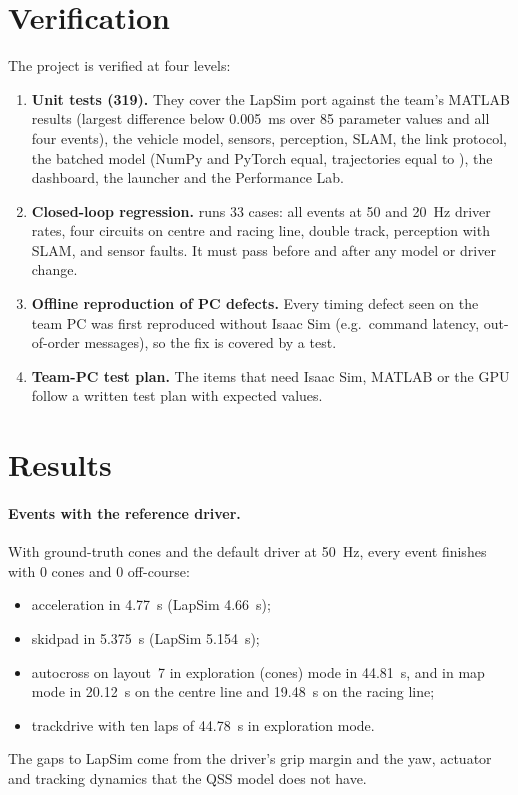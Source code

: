 \documentclass[11pt]{article}
\begin{document}
\section{Verification}\label{sec:verification}
The project is verified at four levels:
\begin{enumerate}
  \item \textbf{Unit tests (319).} They cover the LapSim port against the team's MATLAB results (largest
        difference below \SI{0.005}{ms} over 85 parameter values and all four events), the vehicle model, sensors,
        perception, SLAM, the link protocol, the batched model (NumPy and PyTorch equal, trajectories equal to
        ), the dashboard, the launcher and the Performance Lab.
  \item \textbf{Closed-loop regression.}  runs 33 cases: all events at 50 and \SI{20}{Hz}
        driver rates, four circuits on centre and racing line, double track, perception with SLAM, and sensor
        faults. It must pass before and after any model or driver change.
  \item \textbf{Offline reproduction of PC defects.} Every timing defect seen on the team PC was first reproduced
        without Isaac Sim (e.g.\ command latency, out-of-order messages), so the fix is covered by a test.
  \item \textbf{Team-PC test plan.} The items that need Isaac Sim, MATLAB or the GPU follow a written test plan
        with expected values.
\end{enumerate}

\section{Results}\label{sec:results}
\paragraph{Events with the reference driver.} With ground-truth cones and the default driver at \SI{50}{Hz}, every
event finishes with 0 cones and 0 off-course:
\begin{itemize}
  \item acceleration in \SI{4.77}{s} (LapSim \SI{4.66}{s});
  \item skidpad in \SI{5.375}{s} (LapSim \SI{5.154}{s});
  \item autocross on layout~7 in exploration (cones) mode in \SI{44.81}{s}, and in map mode in \SI{20.12}{s} on the
        centre line and \SI{19.48}{s} on the racing line;
  \item trackdrive with ten laps of \SI{44.78}{s} in exploration mode.
\end{itemize}
The gaps to LapSim come from the driver's grip margin and the yaw, actuator and tracking dynamics that the QSS
model does not have.
\end{document}
